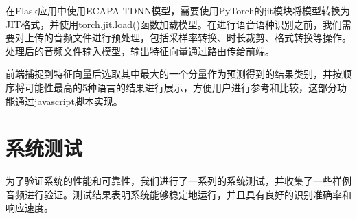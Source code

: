 在Flask应用中使用ECAPA-TDNN模型，需要使用PyTorch的jit模块将模型转换为JIT格式，并使用torch.jit.load()函数加载模型。在进行语音语种识别之前，我们需要对上传的音频文件进行预处理，包括采样率转换、时长裁剪、格式转换等操作。处理后的音频文件输入模型，输出特征向量通过路由传给前端。

前端捕捉到特征向量后选取其中最大的一个分量作为预测得到的结果类别，并按顺序将可能性最高的5种语言的结果进行展示，方便用户进行参考和比较，这部分功能通过javascript脚本实现。

\section{系统测试}
为了验证系统的性能和可靠性，我们进行了一系列的系统测试，并收集了一些样例音频进行验证。测试结果表明系统能够稳定地运行，并且具有良好的识别准确率和响应速度。
